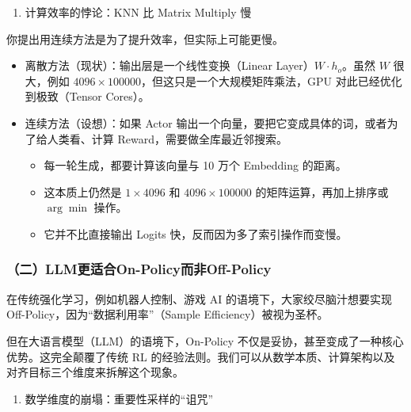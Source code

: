 \begin{enumerate}
\def\labelenumi{\arabic{enumi}.}
\setcounter{enumi}{2}
\tightlist
\item
  计算效率的悖论：KNN 比 Matrix Multiply 慢
\end{enumerate}

你提出用连续方法是为了提升效率，但实际上可能更慢。

\begin{itemize}
\tightlist
\item
  离散方法（现状）：输出层是一个线性变换（Linear Layer）\(W\cdot h_o\)。虽然 \(W\) 很大，例如 \(4096\times100000\)，但这只是一个大规模矩阵乘法，GPU 对此已经优化到极致（Tensor Cores）。
\item
  连续方法（设想）：如果 Actor 输出一个向量，要把它变成具体的词，或者为了给人类看、计算 Reward，需要做全库最近邻搜索。

  \begin{itemize}
  \tightlist
  \item
    每一轮生成，都要计算该向量与 10 万个 Embedding 的距离。
  \item
    这本质上仍然是 \(1\times4096\) 和 \(4096\times100000\) 的矩阵运算，再加上排序或 \(\arg\min\) 操作。
  \item
    它并不比直接输出 Logits 快，反而因为多了索引操作而变慢。
  \end{itemize}
\end{itemize}

\hypertarget{ux4e8cllmux66f4ux9002ux5408on-policyux800cux975eoff-policy}{%
\subsubsection{（二）LLM更适合On-Policy而非Off-Policy}\label{ux4e8cllmux66f4ux9002ux5408on-policyux800cux975eoff-policy}}

在传统强化学习，例如机器人控制、游戏 AI 的语境下，大家绞尽脑汁想要实现 Off-Policy，因为``数据利用率''（Sample Efficiency）被视为圣杯。

但在大语言模型（LLM）的语境下，On-Policy 不仅是妥协，甚至变成了一种核心优势。这完全颠覆了传统 RL 的经验法则。我们可以从数学本质、计算架构以及对齐目标三个维度来拆解这个现象。

\begin{enumerate}
\def\labelenumi{\arabic{enumi}.}
\tightlist
\item
  数学维度的崩塌：重要性采样的``诅咒''
\end{enumerate}

